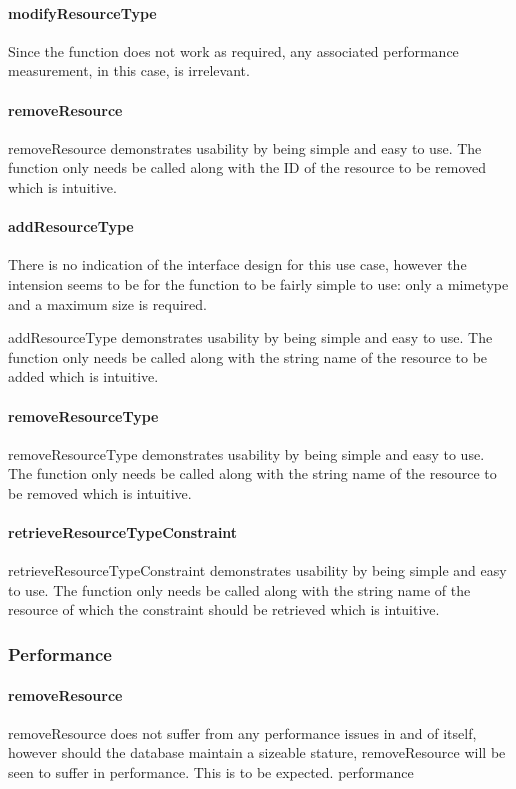 \documentclass[a4paper]{article}
\begin{document}
\paragraph{modifyResourceType}
Since the function does not work as required, any associated performance measurement, in this case, is irrelevant. 

\paragraph{removeResource}
removeResource demonstrates usability by being simple and easy to use. The function only needs be called along with the ID of the resource to be removed which is intuitive.

\paragraph{addResourceType}

There is no indication of the interface design for this use case, however the intension seems to be for the function to be fairly simple to use: only a mimetype and a maximum size is required.


addResourceType demonstrates usability by being simple and easy to use. The function only needs be called along with the string name of the resource to be added which is intuitive.

\paragraph{removeResourceType}
removeResourceType demonstrates usability by being simple and easy to use. The function only needs be called along with the string name of the resource to be removed which is intuitive.

\paragraph{retrieveResourceTypeConstraint}
retrieveResourceTypeConstraint demonstrates usability by being simple and easy to use. The function only needs be called along with the string name of the resource of which the constraint should be retrieved which is intuitive.


\subsubsection {Performance}

\paragraph{removeResource}
removeResource does not suffer from any performance issues in and of itself, however should the database maintain a sizeable stature, removeResource will be seen to suffer in performance. This is to be expected.
performance
\end{document}
